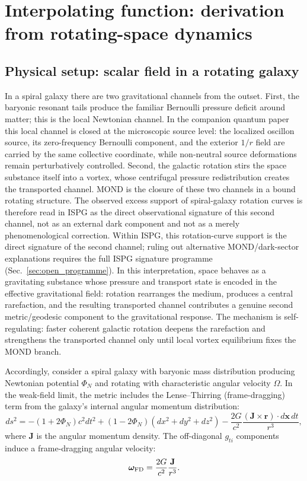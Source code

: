 \documentclass[11pt]{article}
\begin{document}
\section{Interpolating function: derivation from rotating-space dynamics}\label{sec:mu}

\subsection{Physical setup: scalar field in a rotating galaxy}

In a spiral galaxy there are two gravitational channels from the outset.
First, the baryonic resonant tails produce the familiar Bernoulli
pressure deficit around matter; this is the local Newtonian channel.
In the companion quantum paper this local channel is closed at the
microscopic source level: the localized oscillon source, its
zero-frequency Bernoulli component, and the exterior $1/r$ field are
carried by the same collective coordinate, while non-neutral source
deformations remain perturbatively controlled.
Second, the galactic rotation stirs the space substance itself into a
vortex, whose centrifugal pressure redistribution creates the
transported channel.  MOND is the closure of these two channels in a
bound rotating structure.  The observed excess support of spiral-galaxy
rotation curves is therefore read in ISPG as the direct observational
signature of this second channel, not as an external dark component and
not as a merely phenomenological correction.
Within ISPG, this rotation-curve support is the direct signature of the
second channel; ruling out alternative MOND/dark-sector explanations
requires the full ISPG signature programme (Sec.~\ref{sec:open_programme}).
In this interpretation, space behaves as a gravitating substance whose
pressure and transport state is encoded in the effective gravitational
field: rotation rearranges the medium, produces a central rarefaction,
and the resulting transported channel contributes a genuine second
metric/geodesic component to the gravitational response.  The mechanism is
self-regulating: faster coherent
galactic rotation deepens the rarefaction and strengthens the
transported channel only until local vortex equilibrium fixes the MOND
branch.

Accordingly, consider a spiral galaxy with baryonic mass distribution
producing Newtonian potential $\Phi_N$ and rotating with characteristic
angular velocity $\Omega$. In the weak-field limit, the metric includes
the Lense--Thirring (frame-dragging) term from the galaxy's internal
angular momentum distribution:
\begin{equation}
d s^2 = -(1+2\Phi_N)c^2dt^2 + (1-2\Phi_N)(dx^2+dy^2+dz^2) - \frac{2G}{c^2}\frac{(\mathbf{J}\times\mathbf{r})\cdot d\mathbf{x}\,dt}{r^3},
\label{eq:weak_field_rotating}
\end{equation}
where $\mathbf{J}$ is the angular momentum density. The off-diagonal $g_{ti}$ components induce a frame-dragging angular velocity:
\begin{equation}
\bm{\omega}_{\rm FD} = \frac{2G}{c^2}\frac{\mathbf{J}}{r^3}.
\label{eq:frame_dragging}
\end{equation}
\end{document}
